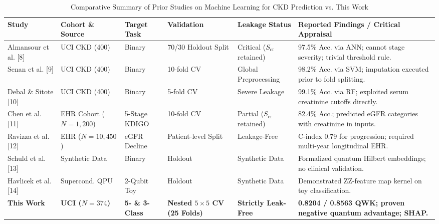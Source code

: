 \documentclass[conference]{IEEEtran}
\begin{document}
\begin{table}[t]
\centering
\caption{Comparative Summary of Prior Studies on Machine Learning for CKD Prediction vs. This Work}
\label{tab:lit_comparison}
\renewcommand{\arraystretch}{0.95}
\footnotesize
\begin{tabularx}{\textwidth}{p{2.6cm}p{2.2cm}p{1.7cm}p{2.0cm}p{2.2cm}X}
\toprule
\textbf{Study} & \textbf{Cohort \& Source} & \textbf{Target Task} & \textbf{Validation} & \textbf{Leakage Status} & \textbf{Reported Findings / Critical Appraisal} \\
\midrule
Almansour et al. [8] & UCI CKD (400) & Binary & 70/30 Holdout Split & Critical ($S_{\text{cr}}$ retained) & 97.5\% Acc. via ANN; cannot stage severity; trivial threshold rule. \\
Senan et al. [9] & UCI CKD (400) & Binary & 10-fold CV & Global Preprocessing & 98.2\% Acc. via SVM; imputation executed prior to fold splitting. \\
Debal \& Sitote [10] & UCI CKD (400) & Binary & 5-fold CV & Severe Leakage & 99.1\% Acc. via RF; exploited serum creatinine cutoffs directly. \\
Chen et al. [11] & EHR Cohort ($N = 1,200$) & 5-Stage KDIGO & 10-fold CV & Partial ($S_{\text{cr}}$ retained) & 82.4\% Acc.; predicted eGFR categories with creatinine in inputs. \\
Ravizza et al. [12] & EHR ($N = 10,450$) & eGFR Decline & Patient-level Split & Leakage-Free & C-index 0.79 for progression; required multi-year longitudinal EHR. \\
Schuld et al. [13] & Synthetic Data & Binary & Holdout & Synthetic Data & Formalized quantum Hilbert embeddings; no clinical validation. \\
Havlicek et al. [14] & Supercond. QPU & 2-Qubit Toy & Holdout & Synthetic Data & Demonstrated ZZ-feature map kernel on toy classification. \\
\textbf{This Work} & \textbf{UCI ($N = 374$)} & \textbf{5- \& 3-Class} & \textbf{Nested $5 \times 5$ CV (25 Folds)} & \textbf{Strictly Leak-Free} & \textbf{0.8204 / 0.8563 QWK; proven negative quantum advantage; SHAP.} \\
\bottomrule
\end{tabularx}
\end{table}
\end{document}

